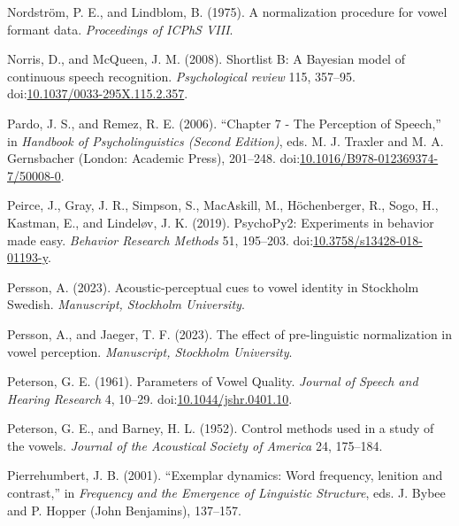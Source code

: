 \documentclass[utf8]{frontiersSCNS}
\newlength{\cslhangindent}
\newlength{\cslentryspacingunit} %
\newenvironment{CSLReferences}[2] %
 {%
  \setlength{\parindent}{0pt}
  \ifodd #1
  \let\oldpar\par
  \def\par{\hangindent=\cslhangindent\oldpar}
  \fi
  \setlength{\parskip}{#2\cslentryspacingunit}
 }%
 {}
\begin{document}
\begin{CSLReferences}{1}{0}
\leavevmode{}%
Nordström, P. E., and Lindblom, B. (1975). A normalization procedure for vowel formant data. \emph{Proceedings of ICPhS VIII}.

\leavevmode{}%
Norris, D., and McQueen, J. M. (2008). Shortlist {B}: {A Bayesian} model of continuous speech recognition. \emph{Psychological review} 115, 357--95. doi:\href{https://doi.org/10.1037/0033-295X.115.2.357}{10.1037/0033-295X.115.2.357}.

\leavevmode{}%
Pardo, J. S., and Remez, R. E. (2006). {``Chapter 7 - {The Perception} of {Speech},''} in \emph{Handbook of {Psycholinguistics} ({Second Edition})}, eds. M. J. Traxler and M. A. Gernsbacher ({London}: {Academic Press}), 201--248. doi:\href{https://doi.org/10.1016/B978-012369374-7/50008-0}{10.1016/B978-012369374-7/50008-0}.

\leavevmode{}%
Peirce, J., Gray, J. R., Simpson, S., MacAskill, M., Höchenberger, R., Sogo, H., Kastman, E., and Lindeløv, J. K. (2019). {PsychoPy2}: {Experiments} in behavior made easy. \emph{Behavior Research Methods} 51, 195--203. doi:\href{https://doi.org/10.3758/s13428-018-01193-y}{10.3758/s13428-018-01193-y}.

\leavevmode{}%
Persson, A. (2023). Acoustic-perceptual cues to vowel identity in {Stockholm Swedish}. \emph{Manuscript, Stockholm University}.

\leavevmode{}%
Persson, A., and Jaeger, T. F. (2023). The effect of pre-linguistic normalization in vowel perception. \emph{Manuscript, Stockholm University}.

\leavevmode{}%
Peterson, G. E. (1961). Parameters of {Vowel Quality}. \emph{Journal of Speech and Hearing Research} 4, 10--29. doi:\href{https://doi.org/10.1044/jshr.0401.10}{10.1044/jshr.0401.10}.

\leavevmode{}%
Peterson, G. E., and Barney, H. L. (1952). Control methods used in a study of the vowels. \emph{Journal of the Acoustical Society of America} 24, 175--184.

\leavevmode{}%
Pierrehumbert, J. B. (2001). {``Exemplar dynamics: {Word} frequency, lenition and contrast,''} in \emph{Frequency and the {Emergence} of {Linguistic Structure}}, eds. J. Bybee and P. Hopper ({John Benjamins}), 137--157.


\end{CSLReferences}
\end{document}
